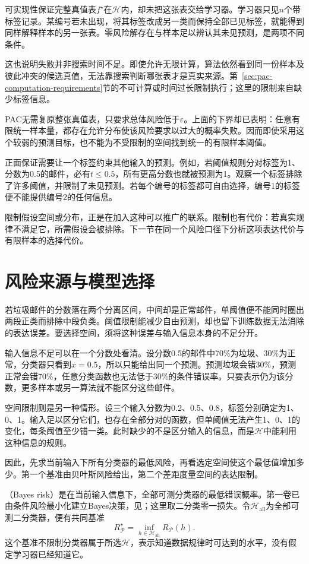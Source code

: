 可实现性保证完整真值表$f^\star$在$\mathcal H$内，却未把这张表交给学习器。学习器只见$n$个带标签记录。某编号若未出现，将其标签改成另一类而保持全部已见标签，就能得到同样解释样本的另一张表。零风险解存在与样本足以辨认其未见预测，是两项不同条件。

这也说明失败并非搜索时间不足。即使允许无限计算，算法依然看到同一份样本及彼此冲突的候选真值，无法靠搜索判断哪张表才是真实来源。第~\ref{sec:pac-computation-requirements}节的不可计算或时间过长限制执行；这里的限制来自缺少标签信息。

PAC无需复原整张真值表，只要求总体风险低于$\varepsilon$。上面的下界却已表明：任意有限统一样本量，都存在允许分布使该风险要求以过大的概率失败。因而即使采用这个较弱的预测目标，也不能为不受限制的空间找到统一的有限样本阈值。

正面保证需要让一个标签约束其他输入的预测。例如，若阈值规则分对标签为1、分数为0.5的邮件，必有$t\leq0.5$，所有更高分数也就被预测为1。观察一个标签排除了许多阈值，并限制了未见预测。若每个编号的标签都可自由选择，编号1的标签便不能提供编号2的任何信息。

限制假设空间或分布，正是在加入这种可以推广的联系。限制也有代价：若真实规律不满足它，所需假设会被排除。下一节在同一个风险口径下分析这项表达代价与有限样本的选择代价。

\section{风险来源与模型选择}
\label{sec:statistical-model-selection}

若垃圾邮件的分数落在两个分离区间，中间却是正常邮件，单阈值便不能同时圈出两段正类而排除中段负类。阈值限制能减少自由预测，却也留下训练数据无法消除的表达误差。要选择空间，须将这种误差与输入信息本身的不足分开。

输入信息不足可以在一个分数处看清。设分数0.5的邮件中70\%为垃圾、30\%为正常，分类器只看到$x=0.5$，所以只能给出同一个预测。预测垃圾会错30\%，预测正常会错70\%，任意分类函数也无法低于30\%的条件错误率。只要表示仍为该分数，更多样本或另一算法就不能区分这些邮件。

空间限制则是另一种情形。设三个输入分数为0.2、0.5、0.8，标签分别确定为1、0、1。输入足以区分它们，也存在全部分对的函数，但单阈值无法产生1、0、1的变化，每条阈值至少错一类。此时缺少的不是区分输入的信息，而是$\mathcal H$中能利用这种信息的规则。

因此，先求当前输入下所有分类器的最低风险，再看选定空间使这个最低值增加多少。第一个基准由贝叶斯风险给出，第二个差距度量空间的表达限制。

（Bayes risk）是在当前输入信息下，全部可测分类器的最低错误概率。第一卷已由条件风险最小化建立Bayes决策，见；这里取二分类零一损失。令$\mathcal H_{\mathrm{all}}$为全部可测二分类器，便有共同基准
\begin{equation}
 R_{\mathcal P}^\star=\inf_{h\in\mathcal H_{\mathrm{all}}}R_{\mathcal P}(h).
 \label{eq:bayes-risk}
\end{equation}
这个基准不限制分类器属于所选$\mathcal H$，表示知道数据规律时可达到的水平，没有假定学习器已经知道它。

